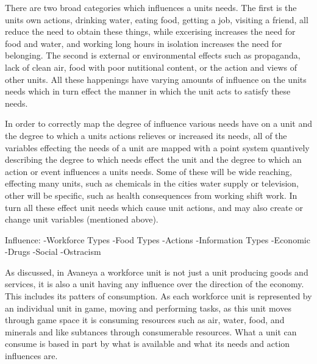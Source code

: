 There are two broad categories which influences a units needs. The first is the units own actions, drinking water, eating food, getting a job, visiting a friend, all reduce the need to obtain these things, while excerising increases the need for food and water, and working long hours in isolation increases the need for belonging. The second is external or environmental effects such as propaganda, lack of clean air, food with poor nutitional content, or the action and views of other units. All these happenings have varying amounts of influence on the units needs which in turn effect the manner in which the unit acts to satisfy these needs.

In order to correctly map the degree of influence various needs have on a unit and the degree to which a units actions relieves or increased its needs, all of the variables effecting the needs of a unit are mapped with a point system quantively describing the degree to which needs effect the unit and the degree to which an action or event influences a units needs. Some of these will be wide reaching, effecting many units, such as chemicals in the cities water supply or television, other will be specific, such as health consequences from working shift work. In turn all these effect unit needs which cause unit actions, and may also create or change unit variables (mentioned above). 



Influence:
-Workforce Types
-Food Types
-Actions
-Information Types
-Economic 
-Drugs
-Social
-Ostracism



%
%
%
%
%
%
%





As discussed, in Avaneya a workforce unit is not just a unit producing goods and services, it is also a unit having any influence over the direction of the economy. This includes its patters of consumption. As each workforce unit is represented by an individual unit in game, moving and performing tasks, as this unit moves through game space it is consuming resources such as air, water, food, and minerals and like subtances through consumerable resources. What a unit can consume is based in part by what is available and what its needs and action influences are.



